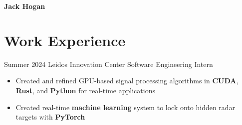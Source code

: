 \documentclass[
	10pt, %
]{FreemanCV}
\begin{document}
\begin{paracol}{2} %



	\parbox[][0.11\textheight][c]{\linewidth}{ %

		{\sffamily\Huge \textbf{Jack Hogan}} %



	}


	\section{Work Experience}





	\jobentry
	{Summer 2024} %
	{} %
	{Leidos Innovation Center} %
	{Software Engineering Intern} %
	{\vspace{-7mm}\begin{itemize}
			\item Created and refined GPU-based signal processing algorithms in \textbf{CUDA}, \textbf{Rust}, and \textbf{Python} for real-time applications
			\item Created real-time \textbf{machine learning} system to lock onto hidden radar targets with \textbf{PyTorch}
		\end{itemize}} %


\end{paracol}
\end{document}
